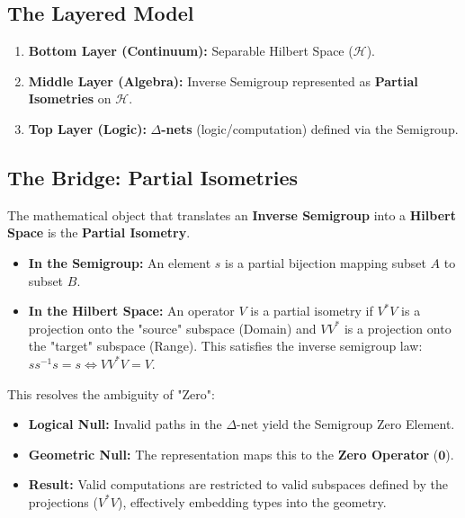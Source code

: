 \documentclass{stex}
\begin{document}
\subsection{The Layered Model}
\begin{enumerate}
    \item \textbf{Bottom Layer (Continuum):} Separable Hilbert Space ($\mathcal{H}$).
    \item \textbf{Middle Layer (Algebra):} Inverse Semigroup represented as \textbf{Partial Isometries} on $\mathcal{H}$.
    \item \textbf{Top Layer (Logic):} \textbf{$\Delta$-nets} (logic/computation) defined via the Semigroup.
\end{enumerate}

\subsection{The Bridge: Partial Isometries}
The mathematical object that translates an \textbf{Inverse Semigroup} into a \textbf{Hilbert Space} is the \textbf{Partial Isometry}.
\begin{itemize}
    \item \textbf{In the Semigroup:} An element $s$ is a partial bijection mapping subset $A$ to subset $B$.
    \item \textbf{In the Hilbert Space:} An operator $V$ is a partial isometry if $V^*V$ is a projection onto the "source" subspace (Domain) and $VV^*$ is a projection onto the "target" subspace (Range). This satisfies the inverse semigroup law: $s s^{-1} s = s \iff V V^* V = V$.
\end{itemize}

This resolves the ambiguity of "Zero":
\begin{itemize}
    \item \textbf{Logical Null:} Invalid paths in the $\Delta$-net yield the Semigroup Zero Element.
    \item \textbf{Geometric Null:} The representation maps this to the \textbf{Zero Operator} ($\mathbf{0}$).
    \item \textbf{Result:} Valid computations are restricted to valid subspaces defined by the projections ($V^*V$), effectively embedding types into the geometry.
\end{itemize}
\end{document}
